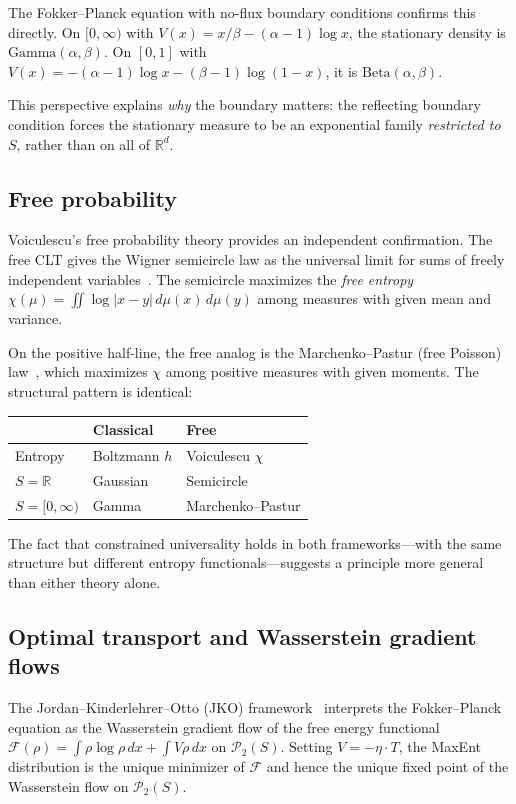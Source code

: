 \documentclass[aps,pre,twocolumn,superscriptaddress,nofootinbib]{revtex4-2}
\theoremstyle{definition}
\theoremstyle{remark}
\newcommand{\R}{\mathbb{R}}
\begin{document}
The Fokker--Planck equation with no-flux boundary conditions confirms this
directly.  On $[0,\infty)$ with $V(x)=x/\beta-(\alpha{-}1)\log x$, the
stationary density is $\mathrm{Gamma}(\alpha,\beta)$.  On $[0,1]$ with
$V(x)=-(\alpha{-}1)\log x-(\beta{-}1)\log(1{-}x)$, it is
$\mathrm{Beta}(\alpha,\beta)$.

This perspective explains \emph{why} the boundary matters: the reflecting
boundary condition forces the stationary measure to be an exponential family
\emph{restricted to} $S$, rather than on all of $\R^d$.

\subsection{Free probability}\label{sec:free}

Voiculescu's free probability theory provides an independent confirmation.
The free CLT gives the Wigner semicircle law as the universal limit for sums
of freely independent variables~\cite{Voiculescu1985}.  The semicircle
maximizes the \emph{free entropy}
$\chi(\mu)=\iint\log|x{-}y|\,d\mu(x)\,d\mu(y)$ among measures with given
mean and variance.

On the positive half-line, the free analog is the Marchenko--Pastur (free
Poisson) law~\cite{MarchenkoPastur1967}, which maximizes $\chi$ among positive
measures with given moments.  The structural pattern is identical:
\begin{center}
\begin{tabular}{lll}
\toprule
& Classical & Free \\
\midrule
Entropy & Boltzmann $h$ & Voiculescu $\chi$ \\
$S=\R$ & Gaussian & Semicircle \\
$S=[0,\infty)$ & Gamma & Marchenko--Pastur \\
\bottomrule
\end{tabular}
\end{center}
The fact that constrained universality holds in both frameworks---with the same
structure but different entropy functionals---suggests a principle more general
than either theory alone.

\subsection{Optimal transport and Wasserstein gradient flows}

The Jordan--Kinderlehrer--Otto (JKO)
framework~\cite{JordanKinderlehrerOtto1998} interprets the Fokker--Planck
equation as the Wasserstein gradient flow of the free energy functional
$\mathcal{F}(\rho)=\int\rho\log\rho\,dx+\int V\rho\,dx$ on $\mathcal{P}_2(S)$.
Setting $V=-\eta\cdot T$, the MaxEnt distribution is the unique minimizer of
$\mathcal{F}$ and hence the unique fixed point of the Wasserstein flow on
$\mathcal{P}_2(S)$.
\end{document}
